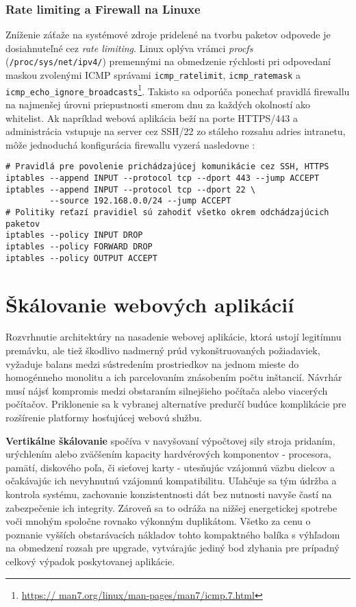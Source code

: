 \documentclass[12pt, a4paper]{article}
\begin{document}
\subsubsection{Rate limiting a Firewall na Linuxe}
Zníženie záťaže na systémové zdroje pridelené na tvorbu paketov odpovede je dosiahnuteľné cez 
\emph{rate limiting}. Linux oplýva vrámci \emph{procfs} (\verb|/proc/sys/net/ipv4/|) premennými na 
obmedzenie rýchlosti pri odpovedaní maskou zvolenými ICMP správami \verb|icmp_ratelimit|, 
\verb|icmp_ratemask| a \verb|icmp_echo_ignore_broadcasts|\footnote{\url{https://
man7.org/linux/man-pages/man7/icmp.7.html}}. Takisto sa odporúča ponechať pravidlá firewallu na najmenšej
úrovni priepustnosti smerom dnu za každých okolností ako whitelist.
Ak napríklad webová aplikácia beží na porte HTTPS/443 a administrácia vstupuje na server cez SSH/22 zo 
stáleho rozsahu adries intranetu, môže jednoduchá konfigurácia firewallu vyzerá nasledovne 
\cite{csirt-hardening}:
\begin{lstlisting}
# Pravidlá pre povolenie prichádzajúcej komunikácie cez SSH, HTTPS
iptables --append INPUT --protocol tcp --dport 443 --jump ACCEPT
iptables --append INPUT --protocol tcp --dport 22 \ 
         --source 192.168.0.0/24 --jump ACCEPT
# Politiky reťazí pravidiel sú zahodiť všetko okrem odchádzajúcich paketov
iptables --policy INPUT DROP
iptables --policy FORWARD DROP
iptables --policy OUTPUT ACCEPT
\end{lstlisting}

\section{Škálovanie webových aplikácií}
Rozvrhnutie architektúry na nasadenie webovej aplikácie, ktorá ustojí legitímnu premávku, ale tiež 
škodlivo nadmerný prúd vykonštruovaných požiadaviek, vyžaduje balans medzi sústredením prostriedkov na 
jednom mieste do homogénneho monolitu a ich parcelovaním znásobením počtu inštancií. Návrhár musí 
nájsť kompromis medzi obstaraním silnejšieho počítača alebo viacerých počítačov. Priklonenie 
sa k vybranej alternatíve predurčí budúce komplikácie pre rozšírenie platformy hosťujúcej webovú 
službu. 

\textbf{Vertikálne škálovanie} spočíva v navyšovaní výpočtovej sily stroja pridaním, urýchlením 
alebo zväčšením kapacity hardvérových komponentov - procesora, pamätí, diskového poľa, či sieťovej karty - 
utesňujúc vzájomnú väzbu dielcov a očakávajúc ich nevyhnutnú vzájomnú kompatibilitu. Uľahčuje sa tým
údržba a kontrola systému, zachovanie konzistentnosti dát bez nutnosti navyše častí na
zabezpečenie ich integrity. Zároveň sa to odráža na nižšej energetickej spotrebe voči 
mnohým spoločne rovnako výkonným duplikátom. Všetko za cenu o poznanie vyšších obstarávacích nákladov tohto 
kompaktného balíka s výhľadom na obmedzení rozsah pre upgrade, vytvárajúc jediný bod zlyhania pre prípadný 
celkový výpadok poskytovanej aplikácie.
\end{document}
